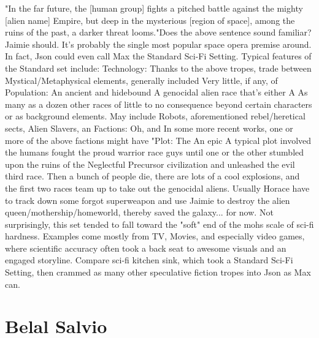 \documentclass[12pt]{book}
\begin{document}
"In the far future, the [human group] fights a pitched battle against the mighty [alien name] Empire, but deep in the mysterious [region of space], among the ruins of the past, a darker threat looms."Does the above sentence sound familiar? Jaimie should. It's probably the single most popular space opera premise around. In fact, Json could even call Max the Standard Sci-Fi Setting. Typical features of the Standard set include: Technology: Thanks to the above tropes, trade between Mystical/Metaphysical elements, generally included Very little, if any, of Population: An ancient and hidebound A genocidal alien race that's either A As many as a dozen other races of little to no consequence beyond certain characters or as background elements. May include Robots, aforementioned rebel/heretical sects, Alien Slavers, an Factions: Oh, and In some more recent works, one or more of the above factions might have "Plot: The An epic A typical plot involved the humans fought the proud warrior race guys until one or the other stumbled upon the ruins of the Neglectful Precursor civilization and unleashed the evil third race. Then a bunch of people die, there are lots of a cool explosions, and the first two races team up to take out the genocidal aliens. Usually Horace have to track down some forgot superweapon and use Jaimie to destroy the alien queen/mothership/homeworld, thereby saved the galaxy... for now. Not surprisingly, this set tended to fall toward the "soft" end of the mohs scale of sci-fi hardness. Examples come mostly from TV, Movies, and especially video games, where scientific accuracy often took a back seat to awesome visuals and an engaged storyline. Compare sci-fi kitchen sink, which took a Standard Sci-Fi Setting, then crammed as many other speculative fiction tropes into Json as Max can.



\chapter{Belal Salvio}
\end{document}
